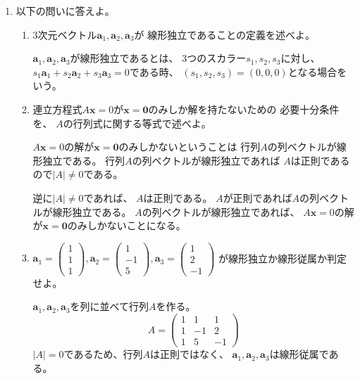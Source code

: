 \documentclass[10pt,a4paper]{ltjsarticle}
\begin{document}
\begin{enumerate}
       \hrulefill
 \item 以下の問いに答えよ。
       \begin{enumerate}
        \item 3次元ベクトル$\bm{a}_{1}, \bm{a}_{2}, \bm{a}_{3}$が
              線形独立であることの定義を述べよ。

              \dotfill

              $\bm{a}_{1}, \bm{a}_{2}, \bm{a}_{3}$が線形独立であるとは、
              3つのスカラー$s_1, s_2, s_3$に対し、
              $s_1\bm{a}_{1} + s_2\bm{a}_{2} + s_3\bm{a}_{3} = 0$である時、
              $(s_1, s_2, s_3) = (0, 0, 0)$となる場合をいう。

              \hrulefill
        \item 連立方程式$A\bm{x}=0$が$\bm{x}=\bm{0}$のみしか解を持たないための
              必要十分条件を、
              $A$の行列式に関する等式で述べよ。

              \dotfill

              $A\bm{x}=0$の解が$\bm{x}=\bm{0}$のみしかないということは
              行列$A$の列ベクトルが線形独立である。
              行列$A$の列ベクトルが線形独立であれば
              $A$は正則であるので$\lvert A \rvert \ne 0$である。

              逆に$\lvert A \rvert \ne 0$であれば、
              $A$は正則である。
              $A$が正則であれば$A$の列ベクトルが線形独立である。
              $A$の列ベクトルが線形独立であれば、
              $A\bm{x}=0$の解が$\bm{x}=\bm{0}$のみしかないことになる。

              \hrulefill
        \item $\bm{a}_{1}=\begin{pmatrix} 1\\ 1\\ 1\end{pmatrix},
              \bm{a}_{2}=\begin{pmatrix} 1\\ -1\\ 5\end{pmatrix},
              \bm{a}_{3}=\begin{pmatrix} 1\\ 2\\ -1\end{pmatrix}$
              が線形独立か線形従属か判定せよ。

              \dotfill

              $\bm{a}_{1}, \bm{a}_{2}, \bm{a}_{3}$を列に並べて行列$A$を作る。
              \begin{equation}
               A= \begin{pmatrix} 1&1&1\\ 1&-1&2\\ 1&5&-1 \end{pmatrix}
              \end{equation}
              $\lvert A \lvert = 0$であるため、行列$A$は正則ではなく、
              $\bm{a}_{1}, \bm{a}_{2}, \bm{a}_{3}$は線形従属である。


\end{enumerate}
\end{enumerate}
\end{document}

